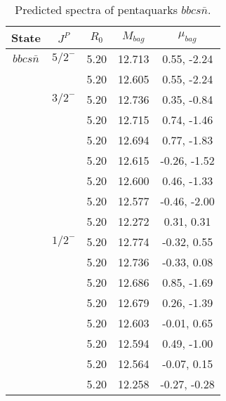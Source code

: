 \documentclass[prd,twocolumn,floatfix,nofootinbib]{revtex4}
\begin{document}
\renewcommand{\tabcolsep}{0.5cm}
\renewcommand{\arraystretch}{1.2}
\begin{table*}[!htbp]
    \caption{Predicted spectra of pentaquarks $bbcs\bar{n}$.}
    \begin{tabular}{ccccc}
        \hline\hline
        {\rm State} &$J^{P}$ &$R_{0}$ &$M_{bag}$ &$\mu_{bag}$ \\ \hline
        ${bbcs\bar{n}}$
            &${5/2}^{-}$    &5.20   &12.713 &0.55, -2.24 \\
            &               &5.20   &12.605 &0.55, -2.24 \\
            &${3/2}^{-}$    &5.20   &12.736 &0.35, -0.84 \\
            &               &5.20   &12.715 &0.74, -1.46 \\
            &               &5.20   &12.694 &0.77, -1.83 \\
            &               &5.20   &12.615 &-0.26, -1.52 \\
            &               &5.20   &12.600 &0.46, -1.33 \\
            &               &5.20   &12.577 &-0.46, -2.00 \\
            &               &5.20   &12.272 &0.31, 0.31 \\
            &${1/2}^{-}$    &5.20   &12.774 &-0.32, 0.55 \\
            &               &5.20   &12.736 &-0.33, 0.08 \\
            &               &5.20   &12.686 &0.85, -1.69 \\
            &               &5.20   &12.679 &0.26, -1.39 \\
            &               &5.20   &12.603 &-0.01, 0.65 \\
            &               &5.20   &12.594 &0.49, -1.00 \\
            &               &5.20   &12.564 &-0.07, 0.15 \\
            &               &5.20   &12.258 &-0.27, -0.28 \\
        \hline\hline
    \end{tabular}
\end{table*}
\end{document}

